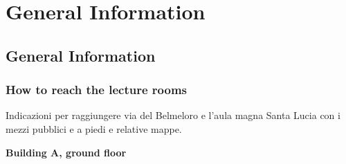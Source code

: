 
\part{General Information}


\chapter*{General Information}



\section*{How to reach the lecture rooms}
Indicazioni per raggiungere via del Belmeloro e l'aula magna Santa Lucia con i mezzi pubblici e a piedi e relative mappe. 
\begin{center}
\textbf{Building A, ground floor}
\end{center}

